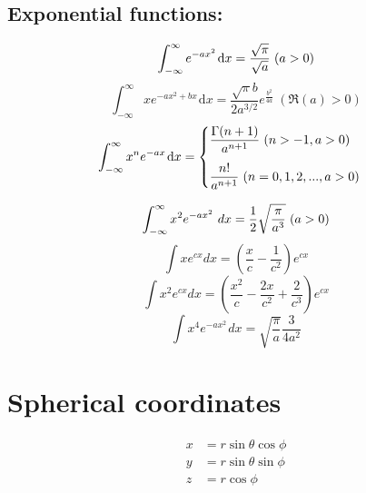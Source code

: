 \documentclass[12pt,a4paper]{article}
\begin{document}
	
	\subsection*{Exponential functions:}
	
	
	
	
	
	\begin{equation}
		\int_{-\infty}^\infty e^{-ax^2}\hspace{1pt}\text{d}x = \frac{\sqrt{\pi}}{\sqrt{a}} \hspace*{3pt}(a > 0)
	\end{equation}
	\begin{equation}
		\int_{-\infty}^\infty x e^{-ax^2 + bx}\hspace{1pt}\text{d}x = \frac{\sqrt{\pi} b}{2a^{3/2}} e^{\frac{b^2}{4a}} \hspace{3pt}(\Re(a) > 0)
	\end{equation}
	\begin{equation}
		\int_{-\infty}^\infty x^n e^{-ax} \hspace{1pt} \text{d}x = \begin{cases}
			\dfrac{\Gamma (n+1)}{a^{n+1}} \hspace*{3pt} (n>-1, a>0)\\[.15in]
			\dfrac{n!}{a^{n+1}} \hspace*{3pt} (n=0,1,2,..., a>0)
		\end{cases}
	\end{equation}
	
	\begin{equation}
		\int_{-\infty}^\infty x^2 e^{-ax^2}\ {dx} = \frac{1}{2} \sqrt{\frac{\pi}{a^3}} \hspace*{3pt} (a > 0)
	\end{equation}
	\begin{equation}
		\int x e^{cx} dx = \left(\frac{x}{c}-\frac{1}{c^2}\right) e^{cx}
	\end{equation}
	\begin{equation}
		\int x^2 e^{cx} dx = \left(\frac{x^2}{c} - \frac{2x}{c^2} + \frac{2}{c^3}\right) e^{cx}
	\end{equation}
	\begin{equation}
		\int x^4 e^{-ax^2}\hspace{1pt} dx = \sqrt{\dfrac{\pi }{a}} \dfrac{3}{4a^2}
	\end{equation}
	
	\section*{Spherical coordinates}
	\begin{align*}
		x &= r \sin \theta \cos \phi \\
		y &= r \sin \theta \sin \phi \\
		z &= r \cos \phi
	\end{align*}
	
\end{document}
